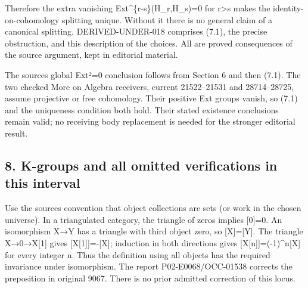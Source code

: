 \documentclass[11pt]{article}
\begin{document}
Therefore the extra vanishing Ext\textasciicircum{}\{r-s\}(H\_\allowbreak{}r,\allowbreak{}H\_\allowbreak{}s)\allowbreak{}\allowbreak{}=0 for r\textgreater s makes the identity-on-cohomology splitting unique. Without it there is no general claim of a canonical splitting. DERIVED-UNDER-018 comprises (7.1)\allowbreak{},\allowbreak{} the precise obstruction,\allowbreak{} and this description of the choices. All are proved consequences of the source argument,\allowbreak{} kept in editorial material.

The source\textquotesingle s global Ext²\allowbreak{}=0 conclusion follows from Section 6 and then (7.1)\allowbreak{}. The two checked More on Algebra receivers,\allowbreak{} current 21522–\allowbreak{}21531 and 28714–\allowbreak{}28725,\allowbreak{} assume projective or free cohomology. Their positive Ext groups vanish,\allowbreak{} so (7.1)\allowbreak{} and the uniqueness condition both hold. Their stated existence conclusions remain valid; no receiving body replacement is needed for the stronger editorial result.

\subsection{8. K-groups and all omitted verifications in this interval}\label{proofs-8774-9196-k-groups-and-all-omitted-verifications-in-this-interval}

Use the source\textquotesingle s convention that object collections are sets (or work in the chosen universe)\allowbreak{}. In a triangulated category,\allowbreak{} the triangle of zeros implies [0]\allowbreak{}\allowbreak{}=0. An isomorphism X\allowbreak{}→Y has a triangle with third object zero,\allowbreak{} so [X]\allowbreak{}\allowbreak{}=[Y]\allowbreak{}. The triangle X\allowbreak{}→0\allowbreak{}→X[1]\allowbreak{} gives [X[1]\allowbreak{}]\allowbreak{}\allowbreak{}=-[X]\allowbreak{}; induction in both directions gives [X[n]\allowbreak{}]\allowbreak{}\allowbreak{}=(-1)\allowbreak{}\textasciicircum{}n[X]\allowbreak{} for every integer n. Thus the definition using all objects has the required invariance under isomorphism. The report P02-E0068/\allowbreak{}OCC-01538 corrects the preposition in original 9067. There is no prior admitted correction of this locus.
\end{document}
